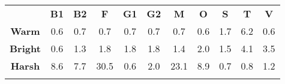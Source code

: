 \begin{tabular}{|c||c|c|c|c|c|c|c|c|c|c|}
	\cline{2-11}
	\multicolumn{1}{c|}{} & \bf{B1} & \bf{B2} & \bf{F} & \bf{G1} & \bf{G2} & \bf{M} & \bf{O} & \bf{S} & \bf{T} & \bf{V} \tabularnewline
	\hhline{-::=:=:=:=:=:=:=:=:=:=:}
	\bf{Warm} & 0.6 & 0.7 & 0.7 & 0.7 & 0.7 & 0.7 & 0.6 & 1.7 & 6.2 & 0.6 \tabularnewline
	\hhline{-||-|-|-|-|-|-|-|-|-|-|}
	\bf{Bright} & 0.6 & 1.3 & 1.8 & 1.8 & 1.8 & 1.4 & 2.0 & 1.5 & 4.1 & 3.5 \tabularnewline
	\hhline{-||-|-|-|-|-|-|-|-|-|-|}
	\bf{Harsh} &  8.6 &  7.7 & 30.5 &  0.6 &  2.0 & 23.1 &  8.9 &  0.7 &  0.8 &  1.2 \tabularnewline
	\hhline{-||-|-|-|-|-|-|-|-|-|-|}
\end{tabular}

